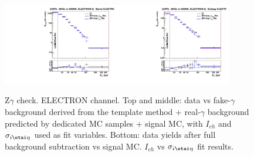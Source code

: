 \begin{figure}[htb]
\begin{center}
\includegraphics[width=0.45\textwidth]{../figs/figs_v11/ELECTRON_ZGamma/PrepareYields/c_BkgSubtrDATAvsSIGMC_c_ELECTRON_ZGamma__UNblind__Barrel__phoEt.pdf}\includegraphics[width=0.45\textwidth]{../figs/figs_v11/ELECTRON_ZGamma/PrepareYields/c_BkgSubtrDATAvsSIGMC_c_ELECTRON_ZGamma__UNblind__Endcap__phoEt.pdf}\\
  \caption{Z$\gamma$ check. ELECTRON channel. Top and middle: data vs fake-$\gamma$ background derived from the template method + real-$\gamma$ background predicted by dedicated MC samples + signal MC, with $I_{ch}$ and $\sigma_{i\etai\eta}$ used as fit variables. Bottom: data yields after full background subtraction vs signal MC. $I_{ch}$ vs $\sigma_{i\etai\eta}$ fit results. }
  \label{fig:DDvsMC_Zg_Data_ELECTRON}
  \end{center}
\end{figure}

